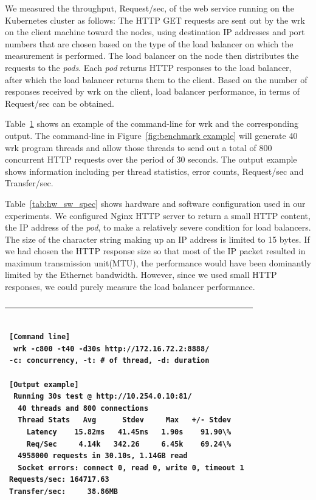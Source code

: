 We measured the throughput, Request/sec, of the web service running on the Kubernetes cluster as follows:
The HTTP GET requests are sent out by the wrk on the client machine toward the nodes,
using destination IP addresses and port numbers that are chosen based on the type of the load balancer on which the measurement is performed.
The load balancer on the node then distributes the requests to the {\em pods}.
Each {\em pod} returns HTTP responses to the load balancer, after which the load balancer returns them to the client.
Based on the number of responses received by wrk on the client, 
load balancer performance, in terms of Request/sec can be obtained. 

Table~\ref{tab:bench_example} shows an example of the command-line for wrk and the corresponding output.
The command-line in Figure~\ref{fig:benchmark example} will generate 40 wrk program threads 
and allow those threads to send out a total of 800 concurrent HTTP requests over the period of 30 seconds.
The output example shows information including per thread statistics, error counts, Request/sec and Transfer/sec.

Table~\ref{tab:hw_sw_spec} shows hardware and software configuration used in our experiments.
We configured Nginx HTTP server to return a small HTTP content, 
the IP address of the {\em pod}, to make a relatively severe condition for load balancers. 
The size of the character string making up an IP address is limited to 15 bytes.
If we had chosen the HTTP response size so that most of the IP packet resulted in maximum transmission unit(MTU), 
the performance would have been dominantly limited by the Ethernet bandwidth.
However, since we used small HTTP responses, we could purely measure the load balancer performance.

\begin{table}[]
  \centering
  \begin{tabular}{l}
    \hline
    \begin{minipage}{13cm}
      \begin{verbatim}

[Command line] 
 wrk -c800 -t40 -d30s http://172.16.72.2:8888/ 
-c: concurrency, -t: # of thread, -d: duration 

[Output example] 
 Running 30s test @ http://10.254.0.10:81/ 
  40 threads and 800 connections 
  Thread Stats   Avg      Stdev     Max   +/- Stdev 
    Latency    15.82ms   41.45ms   1.90s    91.90\% 
    Req/Sec     4.14k   342.26     6.45k    69.24\% 
  4958000 requests in 30.10s, 1.14GB read 
  Socket errors: connect 0, read 0, write 0, timeout 1 
Requests/sec: 164717.63 
Transfer/sec:     38.86MB 
      \end{verbatim}
    \end{minipage}
   \\ \hline
  \end{tabular}
  \caption{}
  \label{tab:bench_example}
\end{table}

